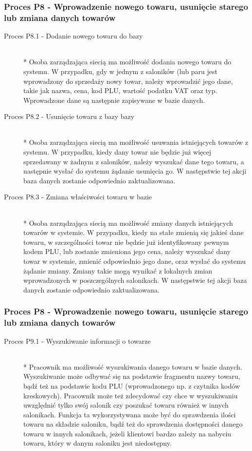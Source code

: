 \subsubsection{Proces P8 - Wprowadzenie nowego towaru, usunięcie starego lub zmiana danych towarów}
\begin{description}
\item[Proces P8.1 - Dodanie nowego towaru do bazy] ~\\*
Osoba zarządzająca siecią ma możliwość dodania nowego towaru do systemu. W przypadku, gdy w jednym z saloników (lub paru jest wprowadzony do sprzedaży nowy towar, należy wprowadzić jego dane, takie jak nazwa, cena, kod PLU, wartość podatku VAT oraz typ. Wprowadzone dane są następnie zapisywane w bazie danych.
\item[Proces P8.2 - Usunięcie towaru z bazy bazy] ~\\*
Osoba zarządzająca siecią ma możliwość usuwania istniejących towarów z systemu. W przypadku, kiedy dany towar nie będzie już więcej sprzedawany w żadnym z saloników, należy wyszukać dane tego towaru, a następnie wysłać do systemu żądanie usunięcia go. W następstwie tej akcji baza danych zostanie odpowiednio zaktualizowana.
\item[Proces P8.3 - Zmiana właściwości towaru w bazie] ~\\*
Osoba zarządzająca siecią ma możliwość zmiany danych istniejących towarów w systemie. W przypadku, kiedy na stałe zmienią się jakieś dane towaru, w szczególności towar nie będzie już identyfikowany pewnym kodem PLU, lub zostanie zmieniona jego cena, należy wyszukać dany towar w systemie, zmienić odpowiednio jego dane, oraz wysłać do systemu żądanie zmiany. Zmiany takie mogą wynikać z lokalnych zmian wprowadzonych w poszczególnych salonikach. W następstwie tej akcji baza danych zostanie odpowiednio zaktualizowana.
\end{description}
\subsubsection{Proces P8 - Wprowadzenie nowego towaru, usunięcie starego lub zmiana danych towarów}
\begin{description}
\item[Proces P9.1 - Wyszukiwanie informacji o towarze] ~\\*
Pracownik ma możliwość wyszukiwania danego towaru w bazie danych. Wyszukiwanie może odbywać się na podstawie fragmentu nazwy towaru, bądź też na podstawie kodu PLU (wprowadzonego np. z czytnika kodów kreskowych). Pracownik może też zdecydować czy chce w wyszukiwaniu uwzględnić tylko swój salonik czy poszukać towaru również w innych salonikach. Funkcja ta wykorzystywana może być do sprawdzenia ilości towaru na składzie saloniku, bądź też do sprawdzenia dostępności danego towaru w innych salonikach, jeżeli klientowi bardzo zależy na nabyciu towaru, który w danym saloniku jest niedostępny.
\end{description}